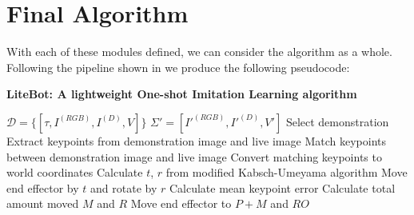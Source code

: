 
\section{Final Algorithm}
With each of these modules defined, we can consider the algorithm as a whole. Following the pipeline shown in  we produce the following pseudocode:

\begin{algorithm}
    \setlength{\baselineskip}{18pt}
    \caption{\textbf{LiteBot: A lightweight One-shot Imitation Learning algorithm}}
    \label{alg:whole-system}
    \begin{algorithmic}[1]
        \Require $\mathcal{D} = \{[\tau, I^{(RGB)}, I^{(D)}, V]\}$ 
        \Statex $\Sigma' = [I'^{(RGB)}, I'^{(D)}, V']$ 
        \State Select demonstration
        \Repeat
            \State Extract keypoints from demonstration image and live image
            \State Match keypoints between demonstration image and live image
            \State Convert matching keypoints to world coordinates
            \State Calculate $t$, $r$ from modified Kabsch-Umeyama algorithm
            \State Move end effector by $t$ and rotate by $r$
            \State Calculate mean keypoint error
        \State Calculate total amount moved $M$ and $R$
            \State Move end effector to $P+M$ and $RO$
        \EndFor
        
    \end{algorithmic}
\end{algorithm}



